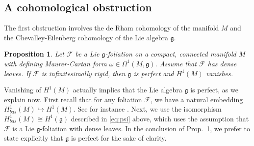 \documentclass[11pt, letterpaper, oneside,reqno]{amsart}
\theoremstyle{plain}
\newtheorem{prop}[thm]{Proposition}
\theoremstyle{underline}
\theoremstyle{definition}
\theoremstyle{remark}
\begin{document}
	
	\subsection{A cohomological obstruction}
	The first obstruction involves the de Rham cohomology of the manifold $M$ and the Chevalley-Eilenberg cohomology of the Lie algebra $\mathfrak{g}$.
	
	
	\begin{prop}\label{prop:obstruction}
		Let $\mathcal{F}$ be a Lie $\mathfrak{g}$-foliation on a compact, connected manifold $M$ with defining Maurer-Cartan form $\omega\in\Omega^{1}(M,\mathfrak{g})$. Assume that $\mathcal{F}$ has dense leaves. If $\mathcal{F}$ is infinitesimally rigid, then $\mathfrak{g}$ is perfect and $H^1(M)$ vanishes. 
	\end{prop}
	
	Vanishing of $H^{1}(M)$ actually implies that the Lie algebra $\mathfrak{g}$ is perfect, as we explain now. First recall that for any foliation $\mathcal{F}$, we have a natural embedding $H^{1}_{bas}(M)\hookrightarrow H^{1}(M)$. See for instance \cite[Prop.~4.1]{Tondeur}. Next, we use the isomorphism $H^{1}_{bas}(M)\cong H^{1}(\mathfrak{g})$ described in \eqref{eq:psi} above, which uses the assumption that $\mathcal{F}$ is a Lie $\mathfrak{g}$-foliation with dense leaves. In the conclusion of Prop.~\ref{prop:obstruction}, we prefer to state explicitly that $\mathfrak{g}$ is perfect for the sake of clarity.
	
\end{document}
